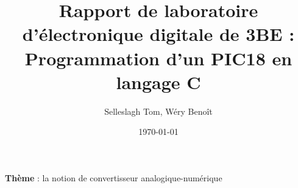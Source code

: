 \documentclass[11pt,a4paper]{article}
\title{Rapport de laboratoire d'électronique digitale de 3BE : Programmation d'un PIC18 en langage C}
\date{\today}
\author{Selleslagh Tom, Wéry Benoît}
\begin{document}
	\maketitle
	\textbf{Thème} : la notion de convertisseur analogique-numérique
	
	
	
	
	
	
\end{document}
